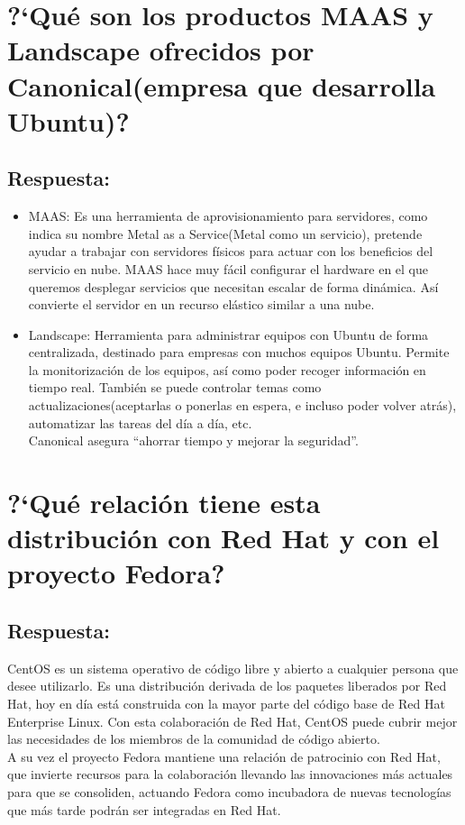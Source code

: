 \newpage
\section{?`Qué son los productos MAAS y Landscape ofrecidos por Canonical(empresa que desarrolla Ubuntu)?}
\subsection{Respuesta:}

\begin{itemize}
	\item MAAS: Es una herramienta de aprovisionamiento para servidores, como indica su nombre Metal as a Service(Metal como un servicio), pretende ayudar a trabajar con servidores físicos para actuar con los beneficios del servicio en nube. MAAS hace muy fácil configurar el hardware en el que queremos desplegar servicios que necesitan escalar de forma dinámica. Así convierte el servidor en un recurso elástico similar a una nube.\cite{cuestion4A}
	\item Landscape: Herramienta para administrar equipos con Ubuntu de forma centralizada, destinado para empresas con muchos equipos Ubuntu.
		Permite la monitorización de los equipos, así como poder
		recoger información en tiempo real. También se puede controlar
		temas como actualizaciones(aceptarlas o ponerlas en espera, e
		incluso poder volver atrás),	automatizar las tareas del día a
		día, etc.\cite{LandscapeDocumentation} \\
		Canonical asegura ``ahorrar tiempo y mejorar la
		seguridad''.\cite{cuestion4B}
\end{itemize}

\section{?`Qué relación tiene esta distribución con Red Hat y con el proyecto Fedora?}
\subsection{Respuesta:}
CentOS es un sistema operativo de código libre y abierto a cualquier persona que desee utilizarlo. Es una distribución derivada de los paquetes liberados por Red Hat, hoy en día está construida con la mayor parte del código base de Red Hat Enterprise Linux. Con esta colaboración de Red Hat, CentOS puede cubrir mejor las necesidades de los miembros de la comunidad de código abierto. \cite{cuestion5BB}
	\\
	A su vez el proyecto Fedora mantiene una relación de patrocinio con Red Hat, que invierte recursos para la colaboración llevando las innovaciones más actuales para que se consoliden, actuando Fedora como incubadora de nuevas tecnologías que más tarde podrán ser integradas en Red Hat.\cite{cuestion5C}
	
